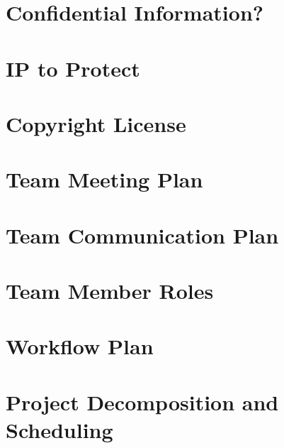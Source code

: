 \documentclass{article}
\begin{document}



\section{Confidential Information?}



\section{IP to Protect}



\section{Copyright License}



\section{Team Meeting Plan}



\section{Team Communication Plan}



\section{Team Member Roles}



\section{Workflow Plan}



\section{Project Decomposition and Scheduling}
\end{document}
